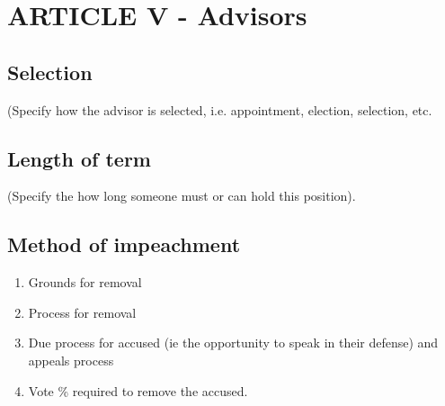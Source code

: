 
 \section{ARTICLE V - Advisors}
 \subsection{Selection}
   (Specify how the advisor is selected, i.e. appointment, election,
   selection, etc.
 \subsection{Length of term}
   (Specify the how long someone must or can hold this position).
 \subsection{Method of impeachment}
     \begin{enumerate}[label=\arabic*.]
       \item Grounds for removal
       \item Process for removal
       \item Due process for accused (ie the opportunity to speak in their
       defense) and appeals process
       \item Vote \% required to remove the accused.
     \end{enumerate}
 
 